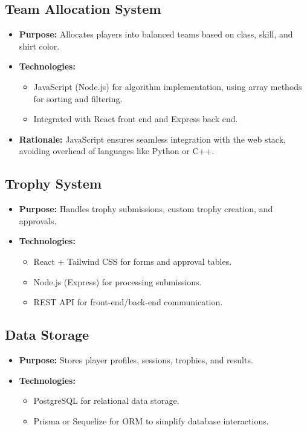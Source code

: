 \documentclass{article}
\begin{document}
\subsection{Team Allocation System}
\begin{itemize}
    \item \textbf{Purpose:} Allocates players into balanced teams based on class, skill, and shirt color.
    \item \textbf{Technologies:}
    \begin{itemize}
        \item JavaScript (Node.js) for algorithm implementation, using array methods for sorting and filtering.
        \item Integrated with React front end and Express back end.
    \end{itemize}
    \item \textbf{Rationale:} JavaScript ensures seamless integration with the web stack, avoiding overhead of languages like Python or C++.
\end{itemize}

\subsection{Trophy System}
\begin{itemize}
    \item \textbf{Purpose:} Handles trophy submissions, custom trophy creation, and approvals.
    \item \textbf{Technologies:}
    \begin{itemize}
        \item React + Tailwind CSS for forms and approval tables.
        \item Node.js (Express) for processing submissions.
        \item REST API for front-end/back-end communication.
    \end{itemize}
\end{itemize}

\subsection{Data Storage}
\begin{itemize}
    \item \textbf{Purpose:} Stores player profiles, sessions, trophies, and results.
    \item \textbf{Technologies:}
    \begin{itemize}
        \item PostgreSQL for relational data storage.
        \item Prisma or Sequelize for ORM to simplify database interactions.
    \end{itemize}
\end{itemize}
\end{document}

